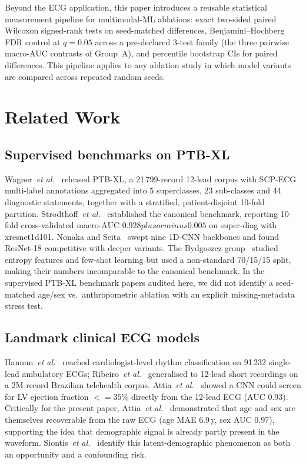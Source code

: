 \documentclass[mathematics,article,pdftex]{Definitions/mdpi}
\def\textbf#1{#1}%
\def\emph#1{#1}%
\def\pm{plus or minus }%
\def\leq{<=}%
\begin{document}
Beyond the ECG application, this paper introduces a reusable statistical measurement pipeline for multimodal-ML ablations: exact two-sided paired Wilcoxon signed-rank tests on seed-matched differences, Benjamini--Hochberg FDR control at $q{=}0.05$ across a \textbf{pre-declared 3-test family} (the three pairwise macro-AUC contrasts of Group~A), and percentile bootstrap CIs for paired differences. This pipeline applies to any ablation study in which model variants are compared across repeated random seeds.

\section{Related Work}\label{sec:relwork}

\subsection{Supervised benchmarks on PTB-XL}
Wagner~\textit{et al.}~\cite{Wagner2020} released PTB-XL, a 21\,799-record 12-lead corpus with SCP-ECG multi-label annotations aggregated into 5 superclasses, 23 sub-classes and 44 diagnostic statements, together with a stratified, patient-disjoint 10-fold partition. Strodthoff~\textit{et al.}~\cite{Strodthoff2021} established the canonical benchmark, reporting 10-fold cross-validated macro-AUC $0.928 \pm 0.005$ on super-diag with xresnet1d101. Nonaka and Seita~\cite{Nonaka2021} swept nine 1D-CNN backbones and found ResNet-18 competitive with deeper variants. The Bydgoszcz group~\cite{Smigiel2021, Palczynski2022} studied entropy features and few-shot learning but used a non-standard 70/15/15 split, making their numbers incomparable to the canonical benchmark. In the supervised PTB-XL benchmark papers audited here, we did not identify a seed-matched age/sex vs.\ anthropometric ablation with an explicit missing-metadata stress test.

\subsection{Landmark clinical ECG models}
Hannun~\textit{et al.}~\cite{Hannun2019} reached cardiologist-level rhythm classification on 91\,232 single-lead ambulatory ECGs; Ribeiro~\textit{et al.}~\cite{Ribeiro2020} generalised to 12-lead short recordings on a 2M-record Brazilian telehealth corpus. Attia~\textit{et al.}~\cite{Attia2019LV} showed a CNN could screen for LV ejection fraction $\leq 35\%$ directly from the 12-lead ECG (AUC 0.93). Critically for the present paper, Attia~\textit{et al.}~\cite{Attia2019AgeSex} demonstrated that age and sex are themselves \emph{recoverable} from the raw ECG (age MAE 6.9\,y, sex AUC 0.97), supporting the idea that demographic signal is already partly present in the waveform. Siontis~\textit{et al.}~\cite{Siontis2021} identify this latent-demographic phenomenon as both an opportunity and a confounding risk.
\end{document}
